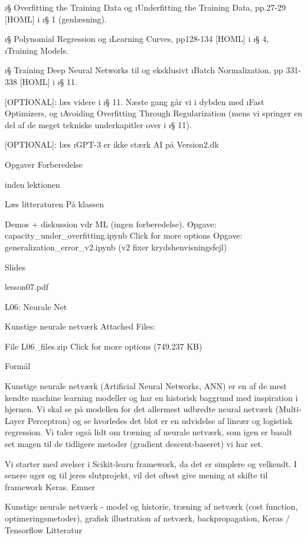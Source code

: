 \i{§ Overfitting the Training Data} og \i{Underfitting the Training Data},
pp.27-29 [HOML] i \i{§ 1} (genlæsning).

\i{§ Polynomial Regression} og \i{Learning Curves}, pp128-134 [HOML] i \i{§
4}, \i{Training Models}.

\i{§ Training Deep Neural Networks} til og eksklusivt \i{Batch Normalization},
pp 331-338 [HOML] i \i{§ 11}.

[OPTIONAL]: læs videre i \i{§ 11}.  Næste gang går vi i dybden med \i{Fast
Optimizers}, og \i{Avoiding Overfitting Through Regularization} (mens vi
springer en del af de meget tekniske underkapitler over i \i{§ 11}).

[OPTIONAL]: læs  \i{GPT-3 er ikke stærk AI} på Version2.dk

Opgaver Forberedelse

inden lektionen

Læs litteraturen
På klassen

        Demos + diskussion vdr ML (ingen forberedelse).
        Opgave:
            capacity_under_overfitting.ipynb Click for more options
        Opgave:
            generalization_error_v2.ipynb (v2 fixer krydshenvisningsfejl)

Slides

lesson07.pdf




L06: Neurale Net

Kunstige neurale netværk
Attached Files:

    File L06_files.zip Click for more options (749.237 KB)

Formål

Kunstige neurale netværk (Artificial Neural Networks, ANN) er en af de mest
kendte machine learning modeller og har en historisk baggrund med inspiration i
hjernen.  Vi skal se på modellen for det allermest udbredte neural netværk
(Multi-Layer Perceptron) og se hvorledes det blot er en udvidelse af lineær og
logistisk regression.  Vi taler også lidt om træning af neurale netværk, som
igen er basalt set magen til de tidligere metoder (gradient descent-baseret) vi
har set.

Vi starter med øvelser i Scikit-learn framework, da det er simplere og
velkendt.  I senere uger og til jeres slutprojekt, vil det oftest give mening
at skifte til framework Keras.  Emner

Kunstige neurale netværk - model og historie, træning af netværk (cost
function, optimeringsmetoder), grafisk illustration af netværk,
backpropagation, Keras / Tensorflow Litteratur

